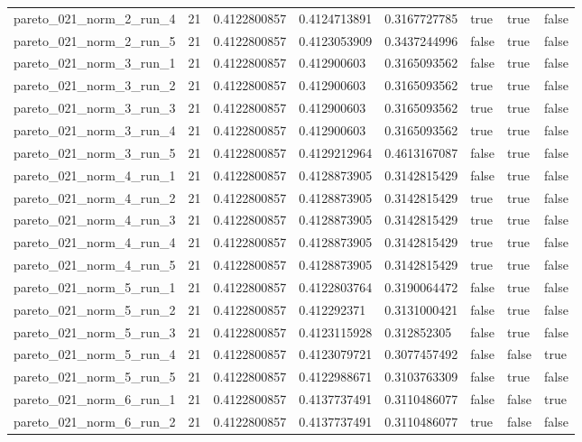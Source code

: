 \begin{tabular}{@{}llllllll@{}}
pareto\_021\_norm\_2\_run\_4 & 21 & 0.4122800857 & 0.4124713891 & 0.3167727785 & true & true & false \\
pareto\_021\_norm\_2\_run\_5 & 21 & 0.4122800857 & 0.4123053909 & 0.3437244996 & false & true & false \\
pareto\_021\_norm\_3\_run\_1 & 21 & 0.4122800857 & 0.412900603 & 0.3165093562 & false & true & false \\
pareto\_021\_norm\_3\_run\_2 & 21 & 0.4122800857 & 0.412900603 & 0.3165093562 & true & true & false \\
pareto\_021\_norm\_3\_run\_3 & 21 & 0.4122800857 & 0.412900603 & 0.3165093562 & true & true & false \\
pareto\_021\_norm\_3\_run\_4 & 21 & 0.4122800857 & 0.412900603 & 0.3165093562 & true & true & false \\
pareto\_021\_norm\_3\_run\_5 & 21 & 0.4122800857 & 0.4129212964 & 0.4613167087 & false & true & false \\
pareto\_021\_norm\_4\_run\_1 & 21 & 0.4122800857 & 0.4128873905 & 0.3142815429 & false & true & false \\
pareto\_021\_norm\_4\_run\_2 & 21 & 0.4122800857 & 0.4128873905 & 0.3142815429 & true & true & false \\
pareto\_021\_norm\_4\_run\_3 & 21 & 0.4122800857 & 0.4128873905 & 0.3142815429 & true & true & false \\
pareto\_021\_norm\_4\_run\_4 & 21 & 0.4122800857 & 0.4128873905 & 0.3142815429 & true & true & false \\
pareto\_021\_norm\_4\_run\_5 & 21 & 0.4122800857 & 0.4128873905 & 0.3142815429 & true & true & false \\
pareto\_021\_norm\_5\_run\_1 & 21 & 0.4122800857 & 0.4122803764 & 0.3190064472 & false & true & false \\
pareto\_021\_norm\_5\_run\_2 & 21 & 0.4122800857 & 0.412292371 & 0.3131000421 & false & true & false \\
pareto\_021\_norm\_5\_run\_3 & 21 & 0.4122800857 & 0.4123115928 & 0.312852305 & false & true & false \\
pareto\_021\_norm\_5\_run\_4 & 21 & 0.4122800857 & 0.4123079721 & 0.3077457492 & false & false & true \\
pareto\_021\_norm\_5\_run\_5 & 21 & 0.4122800857 & 0.4122988671 & 0.3103763309 & false & true & false \\
pareto\_021\_norm\_6\_run\_1 & 21 & 0.4122800857 & 0.4137737491 & 0.3110486077 & false & false & true \\
pareto\_021\_norm\_6\_run\_2 & 21 & 0.4122800857 & 0.4137737491 & 0.3110486077 & true & false & false \\

\end{tabular}
